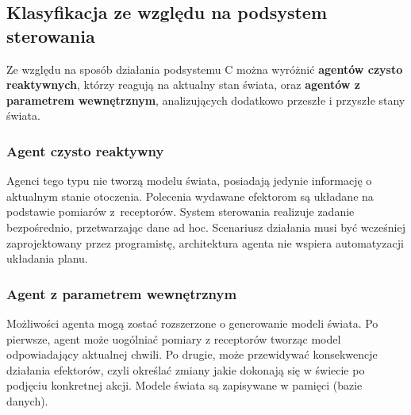 \subsection{Klasyfikacja ze względu na podsystem sterowania}


Ze względu na sposób działania podsystemu C można wyróżnić \textbf{agentów czysto reaktywnych}, którzy reagują na aktualny stan świata, oraz \textbf{agentów z parametrem wewnętrznym}, analizujących dodatkowo przeszłe i przyszłe stany świata. \cite{GNAT}

\subsubsection{Agent czysto reaktywny}
Agenci tego typu nie tworzą modelu świata, posiadają jedynie informację o aktualnym stanie otoczenia. Polecenia wydawane efektorom są układane na podstawie pomiarów z~receptorów. System sterowania realizuje zadanie bezpośrednio, przetwarzając dane ad hoc. Scenariusz działania musi być wcześniej zaprojektowany przez programistę, architektura agenta nie wspiera automatyzacji układania planu.


\subsubsection{Agent z parametrem wewnętrznym}
\label{sec:agentZPW}
Możliwości agenta mogą zostać rozszerzone o generowanie modeli świata. Po pierwsze, agent może uogólniać pomiary z receptorów tworząc model odpowiadający aktualnej chwili. Po drugie, może przewidywać konsekwencje działania efektorów, czyli określać zmiany jakie dokonają się w świecie po podjęciu konkretnej akcji. Modele świata są zapisywane w pamięci (bazie danych).


